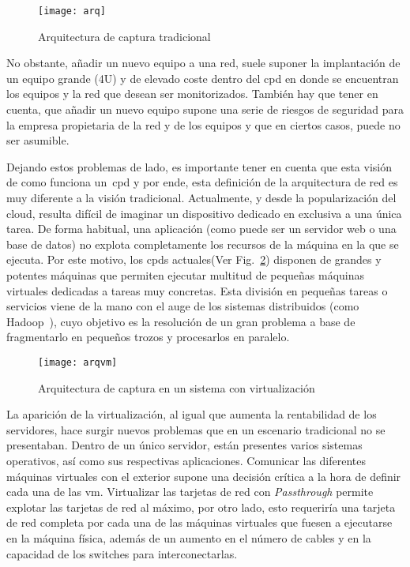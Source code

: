 
\begin{figure}[!th]
\centering
\texttt{[image: arq]}
\caption{Arquitectura de captura tradicional}
\label{fig:dis:arq}
\end{figure}

No obstante, añadir un nuevo equipo a una red, suele suponer la implantación de un equipo grande (4\gls{U}) y de elevado coste dentro del \gls{cpd} en donde se encuentran los equipos y la red que desean ser monitorizados. También hay que tener en cuenta, que añadir un nuevo equipo supone una serie de riesgos de seguridad para la empresa propietaria de la red y de los equipos y que en ciertos casos, puede no ser asumible.

Dejando estos problemas de lado, es importante tener en cuenta que esta visión de como funciona un~\gls{cpd} y por ende, esta definición de la arquitectura de red es muy diferente a la visión tradicional. Actualmente, y desde la popularización del \gls{cloud}, resulta difícil de imaginar un dispositivo dedicado en exclusiva a una única tarea. De forma habitual, una aplicación (como puede ser un servidor web o una base de datos) no explota completamente los recursos de la máquina en la que se ejecuta. Por este motivo, los \glspl{cpd} actuales(Ver Fig.~\ref{fig:dis:arqvm}) disponen de grandes y potentes máquinas que permiten ejecutar multitud de pequeñas máquinas virtuales dedicadas a tareas muy concretas. Esta división en pequeñas tareas o servicios viene de la mano con el auge de los sistemas distribuidos (como Hadoop~\cite{hadoop,hadoop-definitive-guide}), cuyo objetivo es la resolución de un gran problema a base de fragmentarlo en pequeños trozos y procesarlos en paralelo.


\begin{figure}[!th]
\centering
\texttt{[image: arqvm]}
\caption{Arquitectura de captura en un sistema con virtualización}
\label{fig:dis:arqvm}
\end{figure}

La aparición de la virtualización, al igual que aumenta la rentabilidad de los servidores, hace surgir nuevos problemas que en un escenario tradicional no se presentaban. Dentro de un único servidor, están presentes varios sistemas operativos, así como sus respectivas aplicaciones. Comunicar las diferentes máquinas virtuales con el exterior supone una decisión crítica a la hora de definir cada una de las \gls{vm}.
Virtualizar las tarjetas de red con \textit{Passthrough} permite explotar las tarjetas de red al máximo, por otro lado, esto requeriría una tarjeta de red completa por cada una de las máquinas virtuales que fuesen a ejecutarse en la máquina física, además de un aumento en el número de cables y en la capacidad de los switches para interconectarlas.

